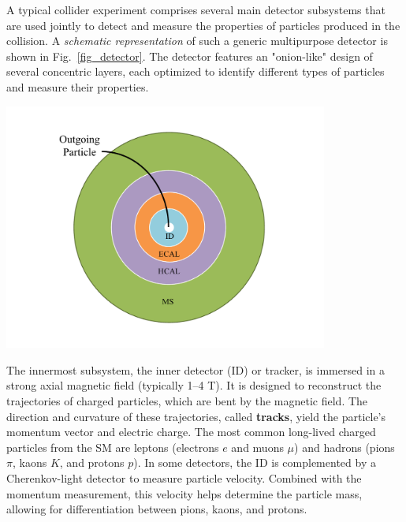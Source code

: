 A typical collider experiment comprises several main detector subsystems that are used jointly to detect and measure the properties of particles produced in the collision. A \textit{schematic representation} of such a generic multipurpose detector is shown in Fig.~\ref{fig_detector}. The detector features an "onion-like" design of several concentric layers, each optimized to identify different types of particles and measure their properties.

\begin{center}
    \includegraphics[width=0.8\textwidth]{Images/transversal_detector.pdf}
    \label{fig_detector}
\end{center}

The innermost subsystem, the inner detector (ID) or tracker, is immersed in a strong axial magnetic field (typically 1–4 T). It is designed to reconstruct the trajectories of charged particles, which are bent by the magnetic field. The direction and curvature of these trajectories, called \textbf{tracks}, yield the particle's momentum vector and electric charge. The most common long-lived charged particles from the SM are leptons (electrons $e$ and muons $\mu$) and hadrons (pions $\pi$, kaons $K$, and protons $p$). In some detectors, the ID is complemented by a Cherenkov-light detector to measure particle velocity. Combined with the momentum measurement, this velocity helps determine the particle mass, allowing for differentiation between pions, kaons, and protons.

